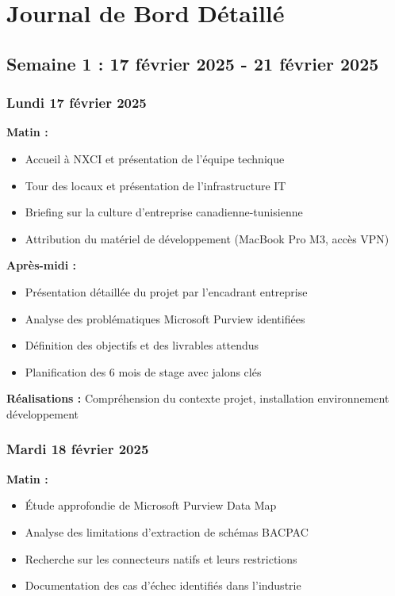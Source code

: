 \documentclass[a4paper,12pt]{article}
\begin{document}
\section*{Journal de Bord Détaillé}

\subsection*{Semaine 1 : 17 février 2025 - 21 février 2025}

\subsubsection*{Lundi 17 février 2025}
\textbf{Matin :}
\begin{itemize}
    \item Accueil à NXCI et présentation de l'équipe technique
    \item Tour des locaux et présentation de l'infrastructure IT
    \item Briefing sur la culture d'entreprise canadienne-tunisienne
    \item Attribution du matériel de développement (MacBook Pro M3, accès VPN)
\end{itemize}

\textbf{Après-midi :}
\begin{itemize}
    \item Présentation détaillée du projet par l'encadrant entreprise
    \item Analyse des problématiques Microsoft Purview identifiées
    \item Définition des objectifs et des livrables attendus
    \item Planification des 6 mois de stage avec jalons clés
\end{itemize}

\textbf{Réalisations :} Compréhension du contexte projet, installation environnement développement

\subsubsection*{Mardi 18 février 2025}
\textbf{Matin :}
\begin{itemize}
    \item Étude approfondie de Microsoft Purview Data Map
    \item Analyse des limitations d'extraction de schémas BACPAC
    \item Recherche sur les connecteurs natifs et leurs restrictions
    \item Documentation des cas d'échec identifiés dans l'industrie
\end{itemize}
\end{document}

